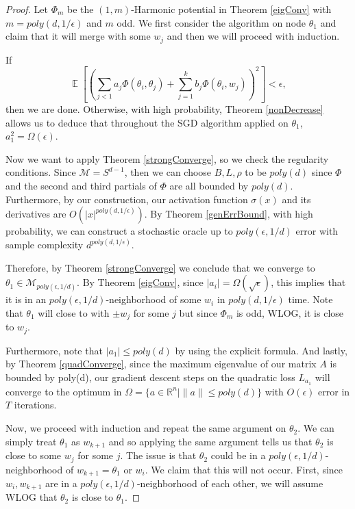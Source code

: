 \documentclass{article}
\newcommand{\R}{{\mathbb{R}}}
\DeclareMathOperator*{\expt}{\mathbb{E}}
\begin{document}
\begin{proof}
Let $\Phi_m$ be the $(1,m)$-Harmonic potential in Theorem \ref{eigConv} with $m = poly(d,1/\epsilon)$ and $m$ odd. We first consider the algorithm on node $\theta_1$ and claim that it will merge with some $w_j$ and then we will proceed with induction. 

If
%
\[ \expt\left[\left( \sum_{j < 1} a_j \Phi(\theta_i,\theta_j) +
    \sum_{j=1}^k b_j \Phi(\theta_i,w_j)\right)^2\right] < \epsilon,\]
then we are done. Otherwise, with high probability, Theorem
\ref{nonDecrease} allows us to deduce that throughout the SGD
algorithm applied on $\theta_1$, $a_1^2 = \Omega(\epsilon)$.

Now we want to apply Theorem \ref{strongConverge}, so we check the regularity conditions. Since $\mathcal{M} = S^{d-1}$, then we can choose $B, L, \rho$ to be $poly(d)$ since $\Phi$ and the second and third partials of $\Phi$ are all bounded by $poly(d)$. Furthermore, by our construction, our activation function $\sigma(x)$ and its derivatives are $O(|x|^{poly(d,1/\epsilon)})$. By Theorem \ref{genErrBound}, with high probability, we can construct a stochastic oracle up to $poly(\epsilon,1/d)$ error with sample complexity $d^{poly(d,1/\epsilon)}$.


Therefore, by Theorem \ref{strongConverge} we conclude that we converge to $\theta_1 \in \mathcal{M}_{poly(\epsilon,1/d)}$. By Theorem \ref{eigConv}, since $|a_i| = \Omega(\sqrt{\epsilon})$, this implies that it is in an $poly(\epsilon,1/d)$-neighborhood of some $w_{i}$ in $poly(d,1/\epsilon)$ time. Note that $\theta_1$ will close to with $\pm w_j$ for some $j$ but since $\Phi_m$ is odd, WLOG, it is close to $w_j$. 

Furthermore, note that $|a_1| \leq poly(d)$ by using the explicit formula. And lastly, by Theorem \ref{quadConverge}, since the maximum eigenvalue of our matrix $A$ is bounded by poly(d), our gradient descent steps on the quadratic loss $L_{a_1}$ will converge to the optimum in $\Omega = \{a \in \R^n | \|a\| \leq poly(d)\}$ with $O(\epsilon)$ error in $T$ iterations.

Now, we proceed with induction and repeat the same argument on $\theta_2$. We can simply treat $\theta_1$ as $w_{k+1}$ and so applying the same argument tells us that $\theta_2$ is close to some $w_j$ for some $j$. The issue is that $\theta_2$ could be in a $poly(\epsilon,1/d)$-neighborhood of $w_{k+1} = \theta_1$ or $w_i$. We claim that this will not occur. First, since $w_i, w_{k+1}$ are in a $poly(\epsilon,1/d)$-neighborhood of each other, we will assume WLOG that $\theta_2$ is close to $\theta_1$.


\end{proof}
\end{document}
